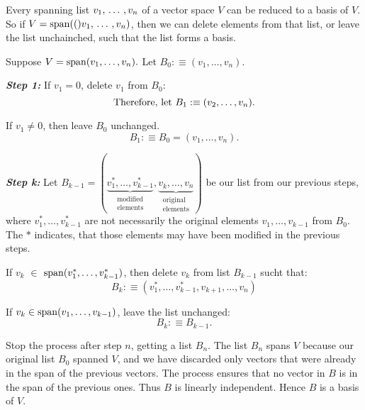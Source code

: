 \setcounter{thm}{29}
\begin{thm} 
  \label{thm: every spanning list contains a basis}
  Every spanning list $v_1, {\, \ldots \,\,}, v_n$ of a vector space $V$ can be reduced to a basis of $V$. So if $V= \operatorname{span} (()v_1, {\, \ldots \,\,}, v_n)$, then we can delete elements from that list, or leave the list unchainched, such that the list forms a basis.
\end{thm}
\begin{prf}
  Suppose $V=\operatorname{span} (v_1, \ldots, v_n).$ Let $B_0 :\equiv (v_1, \ldots, v_n)$.

  \emph{\bfseries Step 1: }
  If $v_1 = 0$, delete $v_1$ from $B_0$:
  \begin{equation}
    $Therefore, let $B_1 :\equiv (v_2, \ldots, v_n).
  \end{equation}

  If $v_1 \neq 0$, then leave $B_0$ unchanged.
  \begin{equation}
    B_1 :\equiv B_0=(v_1, \ldots, v_n).
  \end{equation}

  \emph{\bfseries Step k: }
  Let $B_{k-1} = (\underbrace{v_{1}^*, \ldots, v_{k-1}^*}_{\substack{\text{modified} \\ \text{elements}}}, \underbrace{v^{\phantom{*}}_{k}, \ldots, v^{\phantom{*}}_n}_{\substack{\text{original} \\ \text{elements}}})$ be our list from our previous steps, where $v_1^*, \ldots, v_{k-1}^*$ are not necessarily the original elements $v_1, \ldots, v_{k-1}$ from $B_0$. The $*$ indicates, that those elements may have been modified in the previous steps.

  If $v_k$ $\in$ $\operatorname{span} (v_1^*, \ldots, v_{k-1}^*)$, then delete $v_k$ from list $B_{k-1}$ sucht that:
  \begin{equation}
    B_k :\equiv  (v_{1}^*, \ldots, v_{k-1}^*, v_{k+1}, \ldots, v_n)
  \end{equation}



  If $v_k \in \operatorname{span} (v_1, \ldots, v_{k-1})$, leave the list unchanged:
  \begin{equation}
    B_k :\equiv B_{k-1}.
  \end{equation}

  Stop the process after step $n$, getting a list $B_n$. The list $B_n$ spans $V$ because our original list $B_0$ spanned $V$, and we have discarded only vectors that were already in the span of the previous vectors. The process ensures that no vector in $B$ is in the span of the previous ones. Thus $B$ is linearly independent. Hence $B$ is a basis of $V$.
\end{prf}

